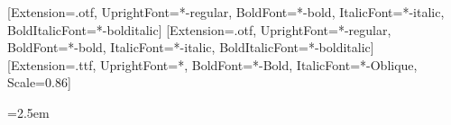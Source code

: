 \usepackage[margin=0.9in]{geometry}
\usepackage{fontspec}
\setmainfont{texgyrepagella}[Extension=.otf, UprightFont=*-regular,
  BoldFont=*-bold, ItalicFont=*-italic, BoldItalicFont=*-bolditalic]
\setsansfont{texgyreheros}[Extension=.otf, UprightFont=*-regular,
  BoldFont=*-bold, ItalicFont=*-italic, BoldItalicFont=*-bolditalic]
\setmonofont{DejaVuSansMono}[Extension=.ttf, UprightFont=*,
  BoldFont=*-Bold, ItalicFont=*-Oblique, Scale=0.86]
\usepackage{amsmath,amssymb,mathtools}
\usepackage{booktabs,longtable,array,tabularx,multirow}
\usepackage{graphicx,float}
\usepackage[font=small,labelfont=bf]{caption}
\usepackage{pdflscape}
\usepackage{xcolor}
\usepackage{siunitx}
\usepackage{enumitem}
\usepackage{microtype}
\emergencystretch=2.5em
\usepackage[numbers,sort&compress]{natbib}
\usepackage{fancyhdr}
\usepackage{lastpage}
\usepackage{tikz}
\usetikzlibrary{arrows.meta,positioning,fit,calc}


\newcommand{\cltag}[2]{\mbox{\textcolor{#1}{\sffamily\scriptsize\bfseries[#2]}}}
\newcommand{\EST}{\cltag{estcol}{EST}}   %
\newcommand{\DER}{\cltag{dercol}{DER}}   %
\newcommand{\HYP}{\cltag{hypcol}{HYP}}   %
\newcommand{\SRC}{\cltag{srccol}{SRC}}   %
\newcommand{\ENG}{\cltag{engcol}{ENG}}   %
\newcommand{\eqid}[1]{\textcolor{inkgray}{\scriptsize\textsf{#1}}}

\newcommand{\iotamap}{\iota}
\newcommand{\Kop}{\mathcal{K}}
\newcommand{\Top}{\mathcal{T}}
\newcommand{\Fop}{\mathcal{F}}
\newcommand{\Pop}{\mathcal{P}}
\newcommand{\Oop}{\mathcal{O}}
\newcommand{\vL}{v_{L}}
\newcommand{\Cw}{\mathcal{C}_{w}}

\pagestyle{fancy}
\fancyhf{}
\setlength{\headheight}{14pt}
